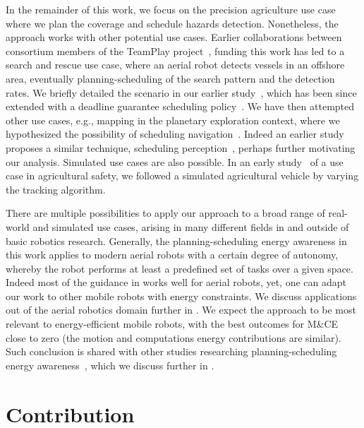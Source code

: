In the remainder of this work, we focus on the precision agriculture use case where we plan the coverage and schedule hazards detection. Nonetheless, the approach works with other potential use cases. Earlier collaborations between consortium members of the TeamPlay project~\citep{teamplay}, funding this work has led to a search and rescue use case, where an aerial robot detects vessels in an offshore area, eventually planning-scheduling of the search pattern and the detection rates. We briefly detailed the scenario in our earlier study~\citep{seewald2019coarse}, which has been since extended with a deadline guarantee scheduling policy~\citep{rouxel2020prego}. We have then attempted other use cases, e.g., mapping in the planetary exploration context, where we hypothesized the possibility of scheduling navigation~\citep{seewald2020beyond}. Indeed an earlier study proposes a similar technique, scheduling perception~\citep{ondruska2015scheduled}, perhaps further motivating our analysis. Simulated use cases are also possible. In an early study~\citep{zamanakos2020energy} of a use case in agricultural safety, we followed a simulated agricultural vehicle by varying the tracking algorithm. 

There are multiple possibilities to apply our approach to a broad range of real-world and simulated use cases, arising in many different fields in and outside of basic robotics research. Generally, the planning-scheduling energy awareness in this work applies to modern aerial robots with a certain degree of autonomy, whereby the robot performs at least a predefined set of tasks over a given space. Indeed most of the guidance in  works well for aerial robots, yet, one can adapt our work to other mobile robots with energy constraints. We discuss applications out of the aerial robotics domain further in . We expect the approach to be most relevant to energy-efficient mobile robots, with the best outcomes for M\&CE close to zero (the motion and computations energy contributions are similar). Such conclusion is shared with other studies researching planning-scheduling energy awareness~\citep{sudhakar2020balancing,ondruska2015scheduled,lahijanian2018resource,mei2005case,brateman2006energy}, which we discuss further in .


\section{Contribution}
\label{sec:contribs}

